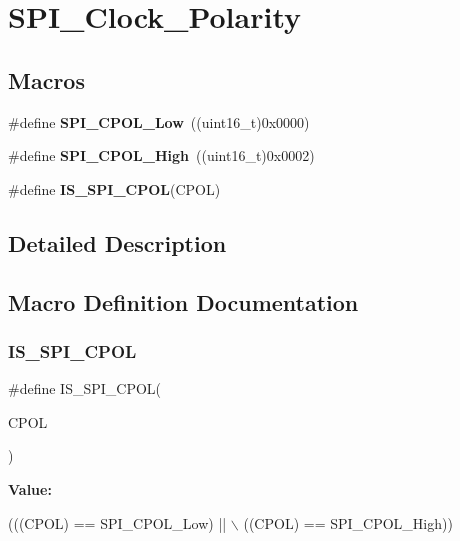 \hypertarget{group___s_p_i___clock___polarity}{}\section{S\+P\+I\+\_\+\+Clock\+\_\+\+Polarity}
\label{group___s_p_i___clock___polarity}
\subsection*{Macros}
\begin{DoxyCompactItemize}
\item 
\mbox{\label{group___s_p_i___clock___polarity_ga3dbc0234c4b4e7c37137e7c189f3c085}} 
\#define {\bfseries S\+P\+I\+\_\+\+C\+P\+O\+L\+\_\+\+Low}~((uint16\+\_\+t)0x0000)
\item 
\mbox{\label{group___s_p_i___clock___polarity_ga4431f2edf42f8298d5bbe693351edbb0}} 
\#define {\bfseries S\+P\+I\+\_\+\+C\+P\+O\+L\+\_\+\+High}~((uint16\+\_\+t)0x0002)
\item 
\#define {\bfseries I\+S\+\_\+\+S\+P\+I\+\_\+\+C\+P\+OL}(C\+P\+OL)
\end{DoxyCompactItemize}


\subsection{Detailed Description}


\subsection{Macro Definition Documentation}
\mbox{\label{group___s_p_i___clock___polarity_gafc1cc5b1ff7e801a409a7a1e6047acf9}} 
\subsubsection{\texorpdfstring{I\+S\+\_\+\+S\+P\+I\+\_\+\+C\+P\+OL}{IS\_SPI\_CPOL}}
{\footnotesize\ttfamily \#define I\+S\+\_\+\+S\+P\+I\+\_\+\+C\+P\+OL(\begin{DoxyParamCaption}\item[{}]{C\+P\+OL }\end{DoxyParamCaption})}

{\bfseries Value\+:}
\begin{DoxyCode}
(((CPOL) == SPI\_CPOL\_Low) || \(\backslash\)
                           ((CPOL) == SPI\_CPOL\_High))
\end{DoxyCode}
